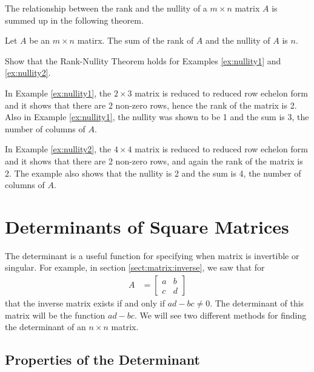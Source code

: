 The relationship between the rank and the nullity of a $m \times n$ matrix $A$ is summed up in the following theorem.

\begin{theorem} \label{thm:rank:nullity}
Let $A$ be an $m \times n$ matirx.  The sum of the rank of $A$ and the nullity of $A$ is $n$.
\end{theorem}

\begin{example}
Show that the Rank-Nullity Theorem holds for Examples \ref{ex:nullity1} and \ref{ex:nullity2}.

\solution

In Example \ref{ex:nullity1}, the $2 \times 3$ matrix is reduced to reduced row echelon form and it shows that there are 2 non-zero rows, hence the rank of the matrix is 2.  Also in Example \ref{ex:nullity1}, the nullity was shown to be 1 and the sum is 3, the number of columns of $A$.

In Example \ref{ex:nullity2}, the $4 \times 4$ matrix is reduced to reduced row echelon form and it shows that there are 2 non-zero rows, and again the rank of the matrix is 2.  The example also shows that the nullity is 2 and the sum is 4, the number of columns of $A$.
\end{example}




\vfill \pagebreak

\section{Determinants of Square Matrices}
\label{sect:det}

The determinant is a useful function for specifying when matrix is invertible or singular.  For example, in section \ref{sect:matrix:inverse}, we saw that for
%
\begin{align*}
A & = \begin{bmatrix}
a & b \\ c & d
\end{bmatrix}
\end{align*}
that the inverse matrix exists if and only if $ad-bc \neq 0$.  The determinant of this matrix will be the function $ad-bc$.  We will see two different methods for finding the determinant of an $n \times n$ matrix.

\subsection{Properties of the Determinant}

